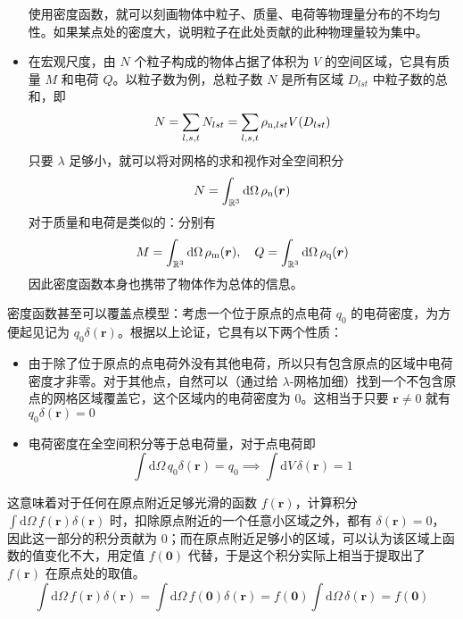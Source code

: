 \documentclass[cn,10pt,math=newtx,citestyle=gb7714-2015,bibstyle=gb7714-2015]{elegantbook}
\def\bm{\boldsymbol}
\def\d{\mathrm d}
\def\R{\mathbb R}
\begin{document}
\begin{itemize}
    使用密度函数，就可以刻画物体中粒子、质量、电荷等物理量分布的不均匀性。如果某点处的密度大，说明粒子在此处贡献的此种物理量较为集中。
    \item 在宏观尺度，由 $N$ 个粒子构成的物体占据了体积为 $V$ 的空间区域，它具有质量 $M$ 和电荷 $Q$。以粒子数为例，总粒子数 $N$ 是所有区域 $D_{lst}$ 中粒子数的总和，即
    \begin{equation*}
        N = \sum_{l,s,t} N_{lst} = \sum_{l,s,t} \rho_{\text n,lst}V(D_{lst})
    \end{equation*}
    只要 $\lambda$ 足够小，就可以将对网格的求和视作对全空间积分
    \begin{equation*}
        N = \int_{\R^3}\text d \Omega\,\rho_{\text n}(\bm r)
    \end{equation*}
    对于质量和电荷是类似的：分别有
    \begin{equation*}
        M = \int_{\R^3}\text d \Omega\,\rho_{\text m}(\bm r),\quad Q = \int_{\R^3}\text d \Omega\,\rho_{\text q}(\bm r)
    \end{equation*}
    因此密度函数本身也携带了物体作为总体的信息。
\end{itemize}

密度函数甚至可以覆盖点模型：考虑一个位于原点的点电荷 $q_0$ 的电荷密度，为方便起见记为 $q_0\delta(\bm r)$。根据以上论证，它具有以下两个性质：
\begin{itemize}
    \item 由于除了位于原点的点电荷外没有其他电荷，所以只有包含原点的区域中电荷密度才非零。对于其他点，自然可以（通过给 $\lambda$-网格加细）找到一个不包含原点的网格区域覆盖它，这个区域内的电荷密度为 0。这相当于只要 $\bm r\ne 0$ 就有 $q_0\delta(\bm r)=0$
    \item 电荷密度在全空间积分等于总电荷量，对于点电荷即
    \begin{equation*}
        \int\d \Omega\,q_0\delta(\bm r)=q_0\implies \int\d V\,\delta(\bm r)=1
    \end{equation*}
\end{itemize}

这意味着对于任何在原点附近足够光滑的函数 $f(\bm r)$，计算积分 $\int\d\Omega\,f(\bm r)\delta(\bm r)$ 时，扣除原点附近的一个任意小区域之外，都有 $\delta(\bm r)=0$，因此这一部分的积分贡献为 0；而在原点附近足够小的区域，可以认为该区域上函数的值变化不大，用定值 $f(\bm 0)$ 代替，于是这个积分实际上相当于提取出了 $f(\bm r)$ 在原点处的取值。
\begin{equation*}
    \int\d\Omega\,f(\bm r)\delta(\bm r) = \int\d\Omega\,f(\bm 0)\delta(\bm r) = f(\bm 0)\int\d\Omega\,\delta(\bm r) = f(\bm 0)
\end{equation*}
\end{document}
